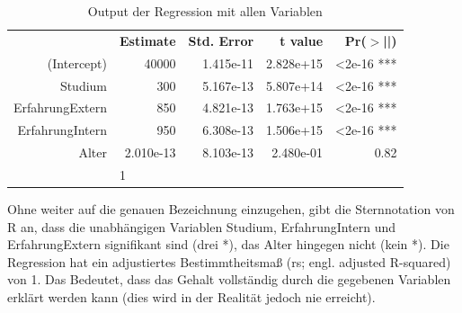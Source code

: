 

\begin{table}[H] \centering
\begin{tabular}{|rrrrr|}
  \hline
 & \textbf{Estimate} & \textbf{Std. Error} & \textbf{t value} & \textbf{Pr($>$||)} \\ 
  \hhline{=====}
(Intercept) & 40000 & 1.415e-11 & 2.828e+15 & <2e-16 *** \\ 
  Studium & 300 & 5.167e-13 & 5.807e+14 & <2e-16 *** \\ 
  ErfahrungExtern & 850 & 4.821e-13 & 1.763e+15  & <2e-16 *** \\ 
  ErfahrungIntern & 950 & 6.308e-13 & 1.506e+15 & <2e-16 *** \\ 
  Alter & 2.010e-13 & 8.103e-13 & 2.480e-01 & 0.82 \\ 
  \hhline{=====}
  \multicolumn{4}{|l|}{Adjusted R-squared} & \multicolumn{1}{l|}{1}\\
\hline
\end{tabular}
\caption{Output der Regression mit allen Variablen}
\label{tab:Regression1:output}
\end{table}

Ohne weiter auf die genauen Bezeichnung einzugehen, gibt die Sternnotation von R an, dass die unabhängigen Variablen Studium, ErfahrungIntern und ErfahrungExtern signifikant sind (drei *), das Alter hingegen nicht (kein *). Die Regression hat ein adjustiertes Bestimmtheitsmaß (\gls{rs}; engl. adjusted R-squared) von 1. Das Bedeutet, dass das Gehalt vollständig durch die gegebenen Variablen erklärt werden kann (dies wird in der Realität jedoch nie erreicht).

